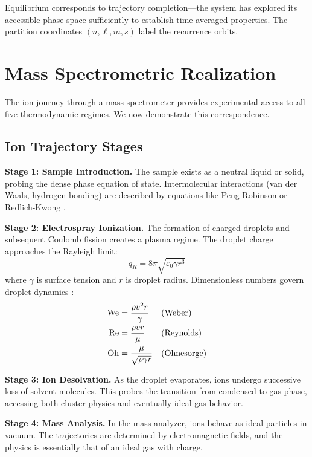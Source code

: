 Equilibrium corresponds to trajectory completion---the system has explored its accessible phase space sufficiently to establish time-averaged properties. The partition coordinates $(n, \ell, m, s)$ label the recurrence orbits.

\section{Mass Spectrometric Realization}
\label{sec:ms}

The ion journey through a mass spectrometer \cite{gross2017mass, fenn1989electrospray} provides experimental access to all five thermodynamic regimes. We now demonstrate this correspondence.

\subsection{Ion Trajectory Stages}

\textbf{Stage 1: Sample Introduction.} The sample exists as a neutral liquid or solid, probing the dense phase equation of state. Intermolecular interactions (van der Waals, hydrogen bonding) are described by equations like Peng-Robinson \cite{peng1976new} or Redlich-Kwong \cite{redlich1949algebraic}.

\textbf{Stage 2: Electrospray Ionization.} The formation of charged droplets and subsequent Coulomb fission \cite{dole1968molecular, iribarne1976evaporation, kebarle2009electrospray} creates a plasma regime. The droplet charge approaches the Rayleigh limit:
\begin{equation}
q_R = 8\pi\sqrt{\varepsilon_0 \gamma r^3}
\end{equation}
where $\gamma$ is surface tension and $r$ is droplet radius. Dimensionless numbers govern droplet dynamics \cite{white2011fluid, ohnesorge1936formation, clift1978bubbles}:
\begin{align}
\mathrm{We} &= \frac{\rho v^2 r}{\gamma} & &\text{(Weber)} \\
\mathrm{Re} &= \frac{\rho v r}{\mu} & &\text{(Reynolds)} \\
\mathrm{Oh} &= \frac{\mu}{\sqrt{\rho \gamma r}} & &\text{(Ohnesorge)}
\end{align}

\textbf{Stage 3: Ion Desolvation.} As the droplet evaporates, ions undergo successive loss of solvent molecules. This probes the transition from condensed to gas phase, accessing both cluster physics and eventually ideal gas behavior.

\textbf{Stage 4: Mass Analysis.} In the mass analyzer, ions behave as ideal particles in vacuum. The trajectories are determined by electromagnetic fields, and the physics is essentially that of an ideal gas with charge.

